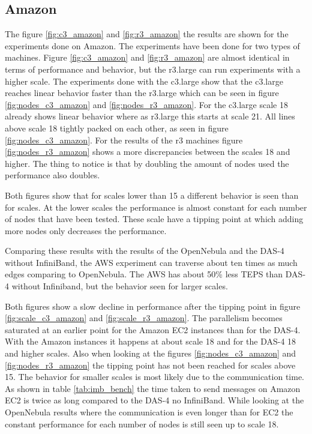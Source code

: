 \subsection{Amazon}
\label{res:amazon}
The figure \ref{fig:c3_amazon} and \ref{fig:r3_amazon} the results are shown for the experiments done on Amazon. The experiments have been done for two types of machines. Figure \ref{fig:c3_amazon} and \ref{fig:r3_amazon} are almost identical in terms of performance and behavior, but the r3.large can run experiments with a higher scale. The experiments done with the c3.large show that the c3.large reaches linear behavior faster than the r3.large which can be seen in figure \ref{fig:nodes_c3_amazon} and \ref{fig:nodes_r3_amazon}. For the c3.large scale 18 already shows linear behavior where as r3.large this starts at scale 21. All lines above scale 18 tightly packed on each other, as seen in figure \ref{fig:nodes_c3_amazon}.
 For the results of the r3 machines figure \ref{fig:nodes_r3_amazon} shows a more discrepancies between the scales 18 and higher. The thing to notice is that by doubling the amount of nodes used the performance also doubles.
 
Both figures show that for scales lower than 15 a different behavior is seen than for scales. At the lower scales the performance is almost constant for each number of nodes that have been tested. These scale have a tipping point at which adding more nodes only decreases the performance. 

Comparing these results with the results of the OpenNebula and the DAS-4 without InfiniBand, the AWS experiment can traverse about ten times as much edges comparing to OpenNebula. The AWS has about 50\% less TEPS than DAS-4 without Infiniband, but the behavior seen for larger scales.

 Both figures show a slow decline in performance after the tipping point in figure \ref{fig:scale_c3_amazon} and \ref{fig:scale_r3_amazon}. The parallelism becomes saturated at an earlier point for the Amazon EC2 instances than for the DAS-4. With the Amazon instances it happens at about scale 18 and for the DAS-4 18 and higher scales. Also when looking at the figures \ref{fig:nodes_c3_amazon} and \ref{fig:nodes_r3_amazon} the tipping point has not been reached for scales above 15. The behavior for smaller scales is most likely due to the communication time. As shown in table \ref{tab:imb_bench} the time taken to send messages on Amazon EC2 is twice as long compared to the DAS-4 no InfiniBand. While looking at the OpenNebula results where the communication is even longer than for EC2 the constant performance for each number of nodes is still seen up to scale 18.

